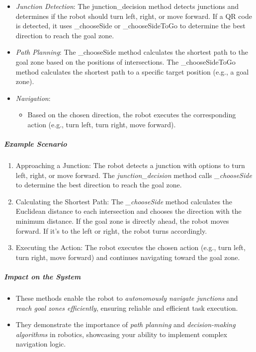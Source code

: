 \documentclass[../../main]{subfiles}
\begin{document}
\begin{itemize}
\item
  \emph{Junction Detection}: The junction\_decision method detects
  junctions and determines if the robot should turn left, right, or move
  forward. If a QR code is detected, it uses \_chooseSide or
  \_chooseSideToGo to determine the best direction to reach the goal
  zone.
\item
  \emph{Path Planning}: The \_chooseSide method calculates the shortest
  path to the goal zone based on the positions of intersections. The
  \_chooseSideToGo method calculates the shortest path to a specific
  target position (e.g., a goal zone).
\item
  \emph{Navigation}:

  \begin{itemize}
  \item
    Based on the chosen direction, the robot executes the corresponding
    action (e.g., turn left, turn right, move forward).
  \end{itemize}
\end{itemize}

\subparagraph{Example Scenario}

\begin{enumerate}
\def\labelenumi{\arabic{enumi}.}
\item
  Approaching a Junction: The robot detects a junction with options to
  turn left, right, or move forward. The \emph{junction\_decision}
  method calls \emph{\_chooseSide} to determine the best direction to
  reach the goal zone.
\item
  Calculating the Shortest Path: The \emph{\_chooseSide} method
  calculates the Euclidean distance to each intersection and chooses the
  direction with the minimum distance. If the goal zone is directly
  ahead, the robot moves forward. If it's to the left or right, the
  robot turns accordingly.
\item
  Executing the Action: The robot executes the chosen action (e.g., turn
  left, turn right, move forward) and continues navigating toward the
  goal zone.
\end{enumerate}
\newpage
\subparagraph{Impact on the System}

\begin{itemize}
\item
  These methods enable the robot to \emph{autonomously navigate
  junctions} and \emph{reach goal zones efficiently}, ensuring reliable
  and efficient task execution.
\item
  They demonstrate the importance of \emph{path planning} and
  \emph{decision-making algorithms} in robotics, showcasing your ability
  to implement complex navigation logic.
\end{itemize}
\end{document}
